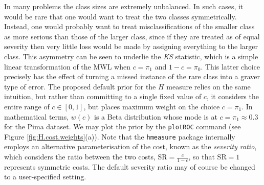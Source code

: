 \documentclass{article}
\begin{document}
In many problems the class sizes are extremely unbalanced. In such cases, it would be rare that one would want to treat the two classes symmetrically. Instead, one would probably want to treat misclassifications of the smaller class as more serious than those of the larger class, since if they are treated as of equal severity then very little loss would be made by assigning everything to the larger class. This asymmetry can be seen to underlie the \textit{KS} statistic, which is a simple linear transformation of the MWL when $c=\pi_1$ and $1-c = \pi_0$. This latter choice precisely has the effect of turning a missed instance of the rare class into a graver type of error. The proposed default prior for the $H$ measure relies on the same intuition, but rather than committing to a single fixed value of $c$, it considers the entire range of $c \in [0,1]$, but places  maximum weight on the choice $c=\pi_1$. In mathematical terms, $w(c)$ is a Beta distribution whose mode is at $c=\pi_1 \approx 0.3$ for the Pima dataset. We may plot the prior by the \verb+plotROC+ command (see Figure \ref{fig:H.cost.weights}(a)). Note that the \verb+hmeasure+ package internally employs an alternative parameterisation of the cost, known as the \emph{severity ratio}, which considers the ratio between the two costs, $\text{SR} = \frac{c}{1-c}$, so that $\text{SR} = 1$ represents symmetric costs. The default severity ratio may of course be changed to a user-specified setting.
\end{document}
